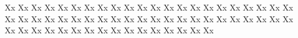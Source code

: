 \documentclass{worksheet}
\begin{document}
\begin{drillsheet}
\calligra
Xx Xx Xx Xx Xx Xx Xx Xx Xx Xx Xx Xx Xx Xx Xx Xx Xx Xx Xx Xx Xx Xx Xx Xx Xx Xx Xx Xx Xx Xx Xx Xx Xx Xx Xx Xx Xx Xx Xx Xx Xx Xx Xx Xx Xx Xx Xx Xx Xx Xx Xx Xx Xx Xx Xx Xx Xx Xx Xx Xx
\end{drillsheet}
\end{document}
